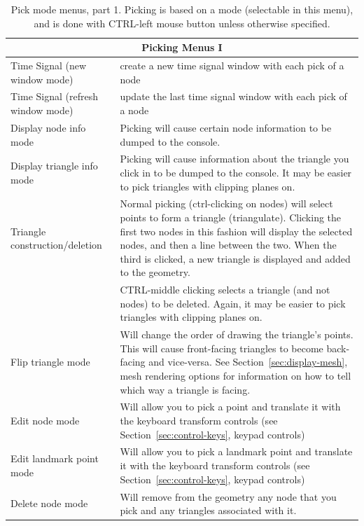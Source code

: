 \begin{table}[ht]
    \caption{\label{table:pickingone} Pick mode menus, part 1.  Picking is
      based on a 
      mode (selectable in this menu), and is done with CTRL-left mouse button
      unless otherwise specified.}
  \begin{center}
    \begin{tabular}{|l|p{4 in}|} \hline
        \multicolumn{2}{|c|}{\textbf{Picking Menus I}} \\ \hline
        Time Signal (new window mode) & create a new time signal window with
        each pick of a node \\
        Time Signal (refresh window mode) & update the last time signal 
        window with each pick of a node \\
        Display node info mode & Picking will cause certain node information
        to be dumped to the console. \\
        Display triangle info mode & Picking will cause information about
        the triangle you click in to be dumped to the console.
        It may be easier to pick triangles with clipping planes on. \\
        Triangle construction/deletion & Normal picking (ctrl-clicking on nodes)
        will select points to form a triangle (triangulate).  Clicking the first 
        two nodes in this fashion will display the selected nodes, and then a 
        line between the two.  When the third is clicked, a new triangle is 
        displayed and added to the geometry. \\
        & CTRL-middle clicking selects a triangle (and not nodes) to be deleted.
        Again, it may be easier to pick triangles with clipping planes on. \\
        Flip triangle mode & Will change the order of drawing the triangle's
        points.  This will cause front-facing triangles to become back-facing
        and vice-versa.  See Section~\ref{sec:display-mesh}, mesh rendering
        options 
        for information on how to tell which way a triangle is facing. \\
        Edit node mode & Will allow you to pick a point and translate it
        with the keyboard transform controls (see
        Section~\ref{sec:control-keys}, keypad controls) \\
        Edit landmark point mode & Will allow you to pick a landmark point
        and translate it with the keyboard transform controls (see
        Section~\ref{sec:control-keys}, keypad controls) \\
        Delete node mode & Will remove from the geometry any node that you pick
        and any triangles associated with it. \\
        \hline
    \end{tabular}
\end{center}
\end{table}

